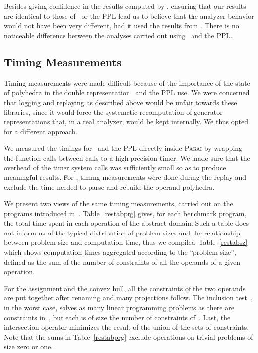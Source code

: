 Besides giving confidence in the results computed by \libpoly ,
ensuring that our results are identical to those of \newpolka\ or the PPL
lead us to believe that the analyzer behavior would not have been very different,
had it used the results from \libpoly .
There is no noticeable difference between the analyses carried out using \newpolka\ and the PPL.
\subsection{Timing Measurements}
Timing measurements were made difficult because of
the importance of the state of polyhedra in the double representation \newpolka\ and the PPL use.
We were concerned that logging and replaying as described above would be unfair towards these libraries, since it would force the systematic recomputation of generator representations that, in a real analyzer, would be kept internally. We thus opted for a different approach.

We measured the timings for \newpolka\ and the PPL directly inside \textsc{Pagai} by wrapping the function calls between calls to a high precision timer.
We made sure that the overhead of the timer system calls was sufficiently small so as to produce meaningful results.
For \libpoly, timing measurements were done during the replay and
exclude the time needed to parse and rebuild the operand polyhedra.

We present two views of the same timing measurements,
carried out on the programs introduced in~.
Table~\ref{restabprg} gives, for each benchmark program, the total time spent in each operation of the abstract domain.
Such a table does not inform us of the typical distribution of problem sizes and the relationship between problem size and computation time, thus we compiled~Table~\ref{restabsz} which
shows computation times aggregated according to the ``problem size'', defined as the sum of the number of constraints of all the operands of a given operation.

For the assignment and the convex hull,
all the constraints of the two operands are put together after renaming
and many projections follow.
The inclusion test~, in the worst case,
solves as many linear programming problems as there are constraints in~,
but each is of size the number of constraints of~.
Last, the intersection operator minimizes the result of the union of the sets of constraints.
Note that the sums in Table~\ref{restabprg} exclude operations on trivial problems of size zero or one.


